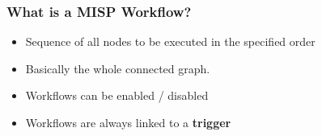 \begin{frame}
    \frametitle{What is a MISP Workflow?}
    \begin{itemize}
        \item Sequence of all nodes to be executed in the specified order
        \item Basically the whole connected graph.
        \item Workflows can be enabled / disabled
        \item Workflows are always linked to a \textbf{trigger}
    \end{itemize}
    \begin{center}
    \end{center}
\end{frame}

